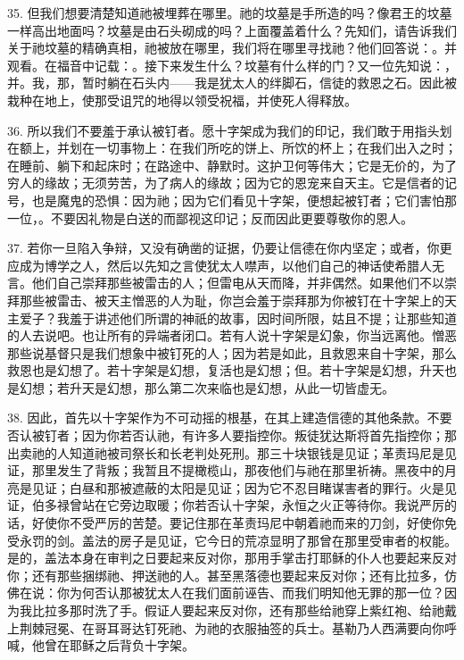 35. 但我们想要清楚知道祂被埋葬在哪里。祂的坟墓是手所造的吗？像君王的坟墓一样高出地面吗？坟墓是由石头砌成的吗？上面覆盖着什么？先知们，请告诉我们关于祂坟墓的精确真相，祂被放在哪里，我们将在哪里寻找祂？他们回答说：。并观看。在福音中记载：。接下来发生什么？坟墓有什么样的门？又一位先知说：，并。我，那，暂时躺在石头内——我是犹太人的绊脚石，信徒的救恩之石。因此被栽种在地上，使那受诅咒的地得以领受祝福，并使死人得释放。\par

36. 所以我们不要羞于承认被钉者。愿十字架成为我们的印记，我们敢于用指头划在额上，并划在一切事物上：在我们所吃的饼上、所饮的杯上；在我们出入之时；在睡前、躺下和起床时；在路途中、静默时。这护卫何等伟大；它是无价的，为了穷人的缘故；无须劳苦，为了病人的缘故；因为它的恩宠来自天主。它是信者的记号，也是魔鬼的恐惧：因为祂；因为它们看见十字架，便想起被钉者；它们害怕那一位，。不要因礼物是白送的而鄙视这印记；反而因此更要尊敬你的恩人。\par

37. 若你一旦陷入争辩，又没有确凿的证据，仍要让信德在你内坚定；或者，你更应成为博学之人，然后以先知之言使犹太人噤声，以他们自己的神话使希腊人无言。他们自己崇拜那些被雷击的人；但雷电从天而降，并非偶然。如果他们不以崇拜那些被雷击、被天主憎恶的人为耻，你岂会羞于崇拜那为你被钉在十字架上的天主爱子？我羞于讲述他们所谓的神祇的故事，因时间所限，姑且不提；让那些知道的人去说吧。也让所有的异端者闭口。若有人说十字架是幻象，你当远离他。憎恶那些说基督只是我们想象中被钉死的人；因为若是如此，且救恩来自十字架，那么救恩也是幻想了。若十字架是幻想，复活也是幻想；但。若十字架是幻想，升天也是幻想；若升天是幻想，那么第二次来临也是幻想，从此一切皆虚无。\par

38. 因此，首先以十字架作为不可动摇的根基，在其上建造信德的其他条款。不要否认被钉者；因为你若否认祂，有许多人要指控你。叛徒犹达斯将首先指控你；那出卖祂的人知道祂被司祭长和长老判处死刑。那三十块银钱是见证；革责玛尼是见证，那里发生了背叛；我暂且不提橄榄山，那夜他们与祂在那里祈祷。黑夜中的月亮是见证；白昼和那被遮蔽的太阳是见证；因为它不忍目睹谋害者的罪行。火是见证，伯多禄曾站在它旁边取暖；你若否认十字架，永恒之火正等待你。我说严厉的话，好使你不受严厉的苦楚。要记住那在革责玛尼中朝着祂而来的刀剑，好使你免受永罚的剑。盖法的房子是见证，它今日的荒凉显明了那曾在那里受审者的权能。是的，盖法本身在审判之日要起来反对你，那用手掌击打耶稣的仆人也要起来反对你；还有那些捆绑祂、押送祂的人。甚至黑落德也要起来反对你；还有比拉多，仿佛在说：你为何否认那被犹太人在我们面前诬告、而我们明知他无罪的那一位？因为我比拉多那时洗了手。假证人要起来反对你，还有那些给祂穿上紫红袍、给祂戴上荆棘冠冕、在哥耳哥达钉死祂、为祂的衣服抽签的兵士。基勒乃人西满要向你呼喊，他曾在耶稣之后背负十字架。\par

